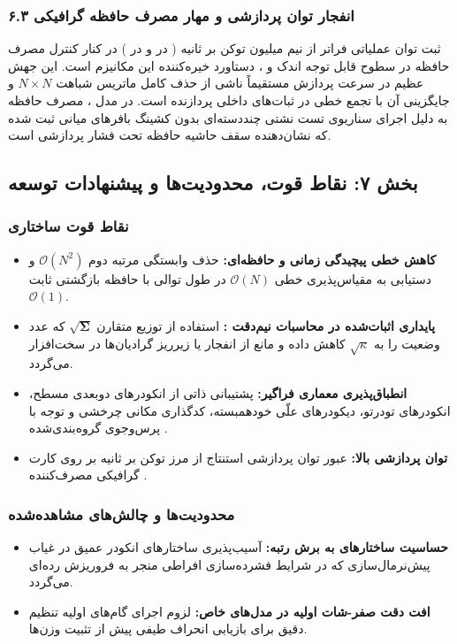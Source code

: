 \subsubsection*{۶.۳ انفجار توان پردازشی و مهار مصرف حافظه گرافیکی}
ثبت توان عملیاتی فراتر از نیم میلیون توکن بر ثانیه ( در  و  در ) در کنار کنترل مصرف حافظه در سطوح قابل توجه اندک  و ، دستاورد خیره‌کننده این مکانیزم است. این جهش عظیم در سرعت پردازش مستقیماً ناشی از حذف کامل ماتریس شباهت $N \times N$ و جایگزینی آن با تجمع خطی در ثبات‌های داخلی پردازنده است. در مدل ، مصرف حافظه  به دلیل اجرای سناریوی تست نشتی چنددسته‌ای بدون کشینگ بافرهای میانی ثبت شده که نشان‌دهنده سقف حاشیه حافظه تحت فشار پردازشی است.

\subsection*{بخش ۷: نقاط قوت، محدودیت‌ها و پیشنهادات توسعه }

\subsubsection*{نقاط قوت ساختاری}
\begin{itemize}
    \item \textbf{کاهش خطی پیچیدگی زمانی و حافظه‌ای:} حذف وابستگی مرتبه دوم $\mathcal{O}(N^2)$ و دستیابی به مقیاس‌پذیری خطی $\mathcal{O}(N)$ در طول توالی با حافظه بازگشتی ثابت $\mathcal{O}(1)$.
    \item \textbf{پایداری اثبات‌شده در محاسبات نیم‌دقت :} استفاده از توزیع متقارن $\sqrt{\mathbf{\Sigma}}$ که عدد وضعیت را به $\sqrt{\kappa}$ کاهش داده و مانع از انفجار یا زیرریز گرادیان‌ها در سخت‌افزار می‌گردد.
    \item \textbf{انطباق‌پذیری معماری فراگیر:} پشتیبانی ذاتی از انکودرهای دوبعدی مسطح، انکودرهای تودرتو، دیکودرهای علّی خودهمبسته، کدگذاری مکانی چرخشی  و توجه با پرس‌وجوی گروه‌بندی‌شده .
    \item \textbf{توان پردازشی بالا:} عبور توان پردازشی استنتاج از مرز  توکن بر ثانیه بر روی کارت گرافیکی مصرف‌کننده .
\end{itemize}

\subsubsection*{محدودیت‌ها و چالش‌های مشاهده‌شده}
\begin{itemize}
    \item \textbf{حساسیت ساختارهای  به برش رتبه:} آسیب‌پذیری ساختارهای انکودر عمیق در غیاب پیش‌نرمال‌سازی که در شرایط فشرده‌سازی افراطی منجر به فروریزش رده‌ای می‌گردد.
    \item \textbf{افت دقت صفر-شات اولیه در مدل‌های خاص:} لزوم اجرای گام‌های اولیه تنظیم دقیق برای بازیابی انحراف طیفی پیش از تثبیت وزن‌ها.
\end{itemize}

